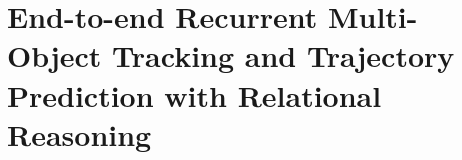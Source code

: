 %
%
%
%
%
%
%
%
%
%
%
%
%


\chapter{End-to-end Recurrent Multi-Object Tracking and Trajectory Prediction with Relational Reasoning}





